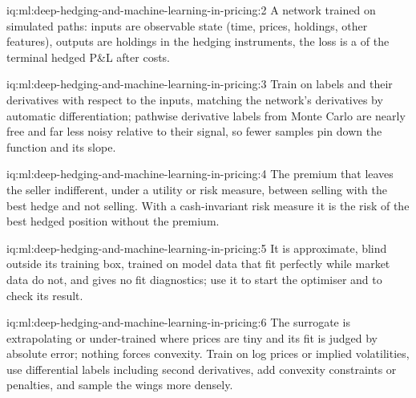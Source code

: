 \begin{solution}{iq:ml:deep-hedging-and-machine-learning-in-pricing:2}
A network  trained on simulated paths: inputs are observable state (time, prices, holdings, other features), outputs
are holdings in the hedging instruments, the loss is a  of the terminal hedged P\&L after costs.
\end{solution}

\begin{solution}{iq:ml:deep-hedging-and-machine-learning-in-pricing:3}
Train on labels and their derivatives with respect to the inputs, matching the network's derivatives by automatic
differentiation; pathwise derivative labels from Monte Carlo are nearly free and far less noisy relative to their signal, so
fewer samples pin down the function and its slope.
\end{solution}

\begin{solution}{iq:ml:deep-hedging-and-machine-learning-in-pricing:4}
The premium that leaves the seller indifferent, under a utility or risk measure, between selling with the best hedge and not
selling. With a cash-invariant risk measure it is the risk of the best hedged position without the premium.
\end{solution}

\begin{solution}{iq:ml:deep-hedging-and-machine-learning-in-pricing:5}
It is approximate, blind outside its training box, trained on model data that fit perfectly while market data do not, and
gives no fit diagnostics; use it to start the optimiser and to check its result.
\end{solution}

\begin{solution}{iq:ml:deep-hedging-and-machine-learning-in-pricing:6}
The surrogate is extrapolating or under-trained where prices are tiny and its fit is judged by absolute error; nothing forces
convexity. Train on log prices or implied volatilities, use differential labels including second derivatives, add convexity
constraints or penalties, and sample the wings more densely.
\end{solution}
